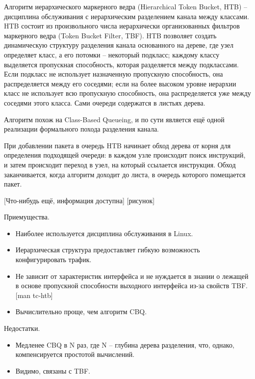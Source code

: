         Алгоритм иерархического маркерного ведра (Hierarchical Token Bucket, HTB) --
        дисциплина обслуживания с иерархическим разделением канала между классами. HTB
        состоит из произвольного числа иерархически организованных фильтров
        маркерного ведра (Token Bucket Filter, TBF). HTB позволяет создать динамическую
    	структуру разделения канала основанного
        на дереве, где узел определяет класс, а его потомки -- некоторый подкласс;
        каждому классу выделяется пропускная способность, которая разделяется между
        подклассами. Если подкласс не использует назначенную пропускную способность,
        она распределяется между его соседями; если на более высоком уровне иерархии
        класс не использует всю пропускную способность, она распределяется уже
        между соседями этого класса. Сами очереди содержатся в листьях дерева.

		Алгоритм похож на Class-Based Queueing, и по сути является ещё одной реализации
		формального похода разделения канала.

		При добавлении пакета в очередь HTB начинает обход дерева от корня
		для определения подходящей очереди: в каждом узле происходит поиск
		инструкций, и затем происходит переход в узел, на который ссылается
		инструкция. Обход заканчивается, когда алгоритм доходит до листа,
		в очередь которого помещается пакет. 

		[Что-нибудь ещё, информация доступна]
    	[рисунок]

		Приемущества.
		\begin{itemize}
			\item Наиболее используется дисциплина обслуживания в Linux.
			\item Иерархическая структура предоставляет гибкую возможность конфигурировать трафик.
            \item Не зависит от характеристик интерфейса и не нуждается в знании о лежащей в
				  основе пропускной способности выходного интерфейса из-за свойств TBF. [man tc-htb]
			\item Вычислительно проще, чем алгоритм CBQ.
		\end{itemize}

		Недостатки.
		\begin{itemize}
			\item Медленее CBQ в N раз, где N -- глубина дерева разделения, что, однако, компенсируется простотой вычислений. 
			\item Видимо, связаны с TBF.
		\end{itemize}


